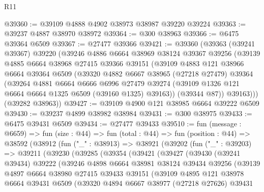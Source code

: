 \begin{lexlean}{R11}
\begin{coremodule}
@39360 := @39109 @4888 @4902 @38973 @38987 @39220 @39224
@39363 := @39237 @4887 @38970 @38972
@39364 := @300 @38963
@39366 := @6475 @39364 @6509
@39367 := @27477 @39366
@39421 := @39360
    (@39363
      (@39241 @39367)
      @39220
      (@39246
        @4886
        @6664
        @38969
        @38124
        @39367
        @39256
        (@39139
          @4885
          @6664
          @38968
          @27415
          @39366
          @39151
          (@39109
            @4883
            @121
            @38966
            @6664
            @39364
            @6509
            (@39320
              @4882
              @6667
              @38965
              (@27218 @27479)
              @39364
              (@39264
                @4881
                @6664
                @6666
                @6996
                @27479
                @39274
                (@39109 @1326 @121 @6664 @6664 @1325 @6509 (@39160 @1325) @39163))
              (@39344 @87))
            @39163)))
      (@39282 @38963))
@39427 := @39109 @4900 @121 @38985 @6664 @39222 @6509
@39430 := @39237 @4899 @38982 @38984
@39431 := @300 @38975
@39433 := @6475 @39431 @6509
@39434 := @27477 @39433
@39510 := fun (message : @6659) =>
  fun (size : @44) =>
  fun (total : @44) =>
  fun (position : @44) =>
  @38592
    (@38912
      (fun ("_" : @38913) =>
      @38921
        (@39202
          (fun ("_" : @39203) =>
          @39211
            (@39230
              (@39285
                (@39354
                  (@39421
                    (@39427
                      (@39430
                        (@39241 @39434)
                        @39222
                        (@39246
                          @4898
                          @6664
                          @38981
                          @38124
                          @39434
                          @39256
                          (@39139
                            @4897
                            @6664
                            @38980
                            @27415
                            @39433
                            @39151
                            (@39109
                              @4895
                              @121
                              @38978
                              @6664
                              @39431
                              @6509
                              (@39320
                                @4894
                                @6667
                                @38977
                                (@27218 @27626)
                                @39431

\end{coremodule}
\end{lexlean}
